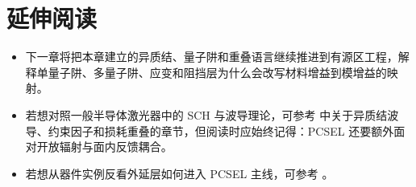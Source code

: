 \section*{延伸阅读}
\begin{itemize}
  \item 下一章将把本章建立的异质结、量子阱和重叠语言继续推进到有源区工程，解释单量子阱、多量子阱、应变和阻挡层为什么会改写材料增益到模增益的映射。

  \item 若想对照一般半导体激光器中的 SCH 与波导理论，可参考 \cite{coldren2012} 中关于异质结波导、约束因子和损耗重叠的章节，但阅读时应始终记得：PCSEL 还要额外面对开放辐射与面内反馈耦合。

  \item 若想从器件实例反看外延层如何进入 PCSEL 主线，可参考 \cite{imada1999,hirose2014,zhoupan2023}。
\end{itemize}
